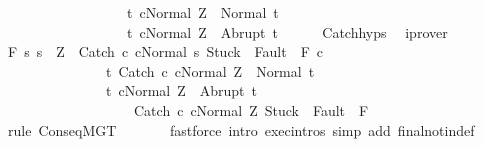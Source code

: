 \begin{isabellebody}
\ \ \ \ \ \ \ \ \ \ \ \ \ \ \ \ \ \ {\isacharbraceleft}t{\isachardot}\ {\isasymGamma}{\isasymturnstile}{\isasymlangle}cNormal\ Z{\isasymrangle}\ {\isasymRightarrow}\ Normal\ t{\isacharbraceright}{\isacharcomma}\isanewline
\ \ \ \ \ \ \ \ \ \ \ \ \ \ \ \ \ \ {\isacharbraceleft}t{\isachardot}\ {\isasymGamma}{\isasymturnstile}{\isasymlangle}cNormal\ Z{\isasymrangle}\ {\isasymRightarrow}\ Abrupt\ t{\isacharbraceright}{\isachardoublequoteclose}\isanewline
\ \ \ \ \isamarkupfalse%
\ Catch{\isachardot}hyps\ \isamarkupfalse%
\ iprover\isanewline
\ \ \isamarkupfalse%
\ {\isachardoublequoteopen}{\isasymGamma}{\isacharcomma}{\isasymTheta}{\isasymturnstile}\isactrlbsub {\isacharslash}F\isactrlesub \ {\isacharbraceleft}s{\isachardot}\ s\ {\isacharequal}\ Z\ {\isasymand}\ {\isasymGamma}{\isasymturnstile}{\isasymlangle}Catch\ c\ cNormal\ s{\isasymrangle}\ {\isasymRightarrow}{\isasymnotin}{\isacharparenleft}{\isacharbraceleft}Stuck{\isacharbraceright}\ {\isasymunion}\ Fault\ {\isacharbackquote}\ {\isacharparenleft}{\isacharminus}F{\isacharparenright}{\isacharparenright}{\isacharbraceright}\ c\isanewline
\ \ \ \ \ \ \ \ \ \ \ \ \ \ \ {\isacharbraceleft}t{\isachardot}\ {\isasymGamma}{\isasymturnstile}{\isasymlangle}Catch\ c\ cNormal\ Z{\isasymrangle}\ {\isasymRightarrow}\ Normal\ t{\isacharbraceright}{\isacharcomma}\isanewline
\ \ \ \ \ \ \ \ \ \ \ \ \ \ \ {\isacharbraceleft}t{\isachardot}\ {\isasymGamma}{\isasymturnstile}{\isasymlangle}cNormal\ Z{\isasymrangle}\ {\isasymRightarrow}\ Abrupt\ t\ {\isasymand}\ \isanewline
\ \ \ \ \ \ \ \ \ \ \ \ \ \ \ \ \ \ \ {\isasymGamma}{\isasymturnstile}{\isasymlangle}Catch\ c\ cNormal\ Z{\isasymrangle}\ {\isasymRightarrow}{\isasymnotin}{\isacharparenleft}{\isacharbraceleft}Stuck{\isacharbraceright}\ {\isasymunion}\ Fault\ {\isacharbackquote}\ {\isacharparenleft}{\isacharminus}F{\isacharparenright}{\isacharparenright}{\isacharbraceright}{\isachardoublequoteclose}\isanewline
\ \ \ \ \isamarkupfalse%
\ {\isacharparenleft}rule\ ConseqMGT{\isacharparenright}\isanewline
\ \ \ \ \ \ \ {\isacharparenleft}fastforce\ intro{\isacharcolon}\ exec{\isachardot}intros\ simp\ add{\isacharcolon}\ final{\isacharunderscore}notin{\isacharunderscore}def{\isacharparenright}\isanewline

\end{isabellebody}
